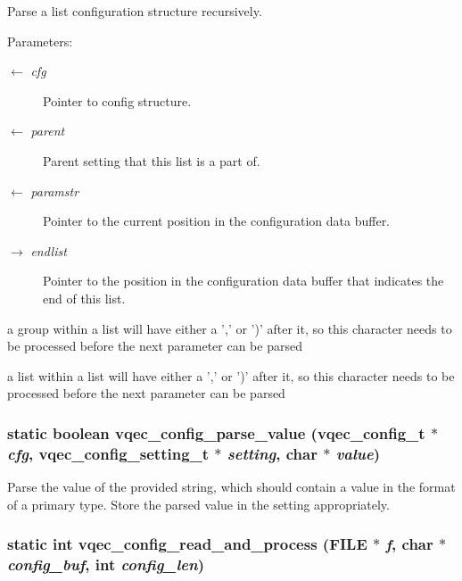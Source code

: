 Parse a list configuration structure recursively.

\begin{Desc}
\item[Parameters:]
\begin{description}
\item[\mbox{$\leftarrow$} {\em cfg}]Pointer to config structure. \item[\mbox{$\leftarrow$} {\em parent}]Parent setting that this list is a part of. \item[\mbox{$\leftarrow$} {\em paramstr}]Pointer to the current position in the configuration data buffer. \item[\mbox{$\rightarrow$} {\em endlist}]Pointer to the position in the configuration data buffer that indicates the end of this list. \end{description}
\end{Desc}


a group within a list will have either a ',' or ')' after it, so this character needs to be processed before the next parameter can be parsed

a list within a list will have either a ',' or ')' after it, so this character needs to be processed before the next parameter can be parsed 
\subsubsection{\setlength{\rightskip}{0pt plus 5cm}static boolean vqec\_\-config\_\-parse\_\-value (\bf{vqec\_\-config\_\-t} $\ast$ {\em cfg}, \bf{vqec\_\-config\_\-setting\_\-t} $\ast$ {\em setting}, char $\ast$ {\em value})\hspace{0.3cm}{\tt  [static]}}\label{vqec__config__parser_8c_e9b7f6c7a536591912afdf3baf319d55}


Parse the value of the provided string, which should contain a value in the format of a primary type. Store the parsed value in the setting appropriately. 
\subsubsection{\setlength{\rightskip}{0pt plus 5cm}static int vqec\_\-config\_\-read\_\-and\_\-process (FILE $\ast$ {\em f}, char $\ast$ {\em config\_\-buf}, int {\em config\_\-len})\hspace{0.3cm}{\tt  [static]}}\label{vqec__config__parser_8c_ccc9da04b6eff9f2d82449006937e298}


